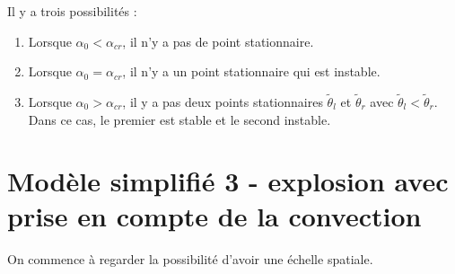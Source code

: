 \documentclass[10pt,a4paper,twocolumn]{report}
\begin{document}
	\subsubsection{} %
	Il y a trois possibilités : 
	\begin{enumerate}
		\item Lorsque $\alpha_0 < \alpha_{cr}$,  il n'y a pas de point stationnaire.
		\item Lorsque $\alpha_0 = \alpha_{cr}$,  il n'y a un point stationnaire qui est instable.
		\item Lorsque $\alpha_0 > \alpha_{cr}$,  il y a pas deux points stationnaires $\tilde{\theta}_l$ et $\tilde{\theta}_r$ avec $\tilde{\theta}_l < \tilde{\theta}_r$. Dans ce cas, le premier est stable et le second instable.
	\end{enumerate}


\section{Modèle simplifié 3 - explosion avec prise en compte de la convection}
On commence à regarder la possibilité d'avoir une échelle spatiale.
\end{document}
